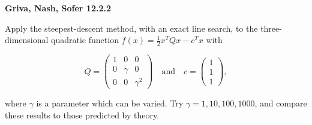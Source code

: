 \textbf{Griva, Nash, Sofer 12.2.2}

Apply the steepest-descent method, with an exact line search, to the three-dimensional quadratic function 
$f(x) = \frac{1}{2} x^T Q x - c^T x$ with

$$
Q = \begin{pmatrix}
    1 & 0      & 0 \\
    0 & \gamma & 0 \\
    0 & 0      & \gamma^2
\end{pmatrix} \quad \text{and} \quad c = \begin{pmatrix}
    1 \\
    1 \\
    1
\end{pmatrix},
$$

where $\gamma$ is a parameter which can be varied. Try $\gamma = 1, 10, 100, 1000$, and compare these results to those
predicted by theory.

